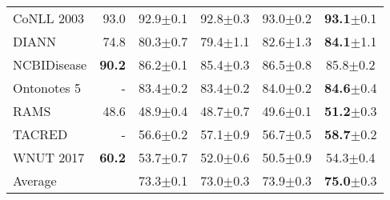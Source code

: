 \begin{table}
{\begin{tabular}{l|r|cc|cc}
            CoNLL 2003 & \citep{lu-etal-2022-unified} 93.0 & 92.9${\scriptscriptstyle\pm}$\tiny{0.1} & 92.8${\scriptscriptstyle\pm}$\tiny{0.3} & 93.0${\scriptscriptstyle\pm}$\tiny{0.2} & \textbf{93.1}${\scriptscriptstyle\pm}$\tiny{0.1} \\
            
            DIANN & \citep{zabala2018hybrid} 74.8 & 80.3${\scriptscriptstyle\pm}$\tiny{0.7} & 79.4${\scriptscriptstyle\pm}$\tiny{1.1} & 82.6${\scriptscriptstyle\pm}$\tiny{1.3} & \textbf{84.1}${\scriptscriptstyle\pm}$\tiny{1.1} \\
            
            NCBIDisease & \citep{DBLP:journals/corr/abs-2304-08085} \textbf{90.2} & 86.2${\scriptscriptstyle\pm}$\tiny{0.1} & 85.4${\scriptscriptstyle\pm}$\tiny{0.3} & 86.5${\scriptscriptstyle\pm}$\tiny{0.8} & 85.8${\scriptscriptstyle\pm}$\tiny{0.2} \\
            
            Ontonotes 5 & - & 83.4${\scriptscriptstyle\pm}$\tiny{0.2} & 83.4${\scriptscriptstyle\pm}$\tiny{0.2} & 84.0${\scriptscriptstyle\pm}$\tiny{0.2} & \textbf{84.6}${\scriptscriptstyle\pm}$\tiny{0.4} \\
            
            RAMS & \citep{li-etal-2021-document} 48.6 & 48.9${\scriptscriptstyle\pm}$\tiny{0.4} & 48.7${\scriptscriptstyle\pm}$\tiny{0.7} & 49.6${\scriptscriptstyle\pm}$\tiny{0.1} & \textbf{51.2}${\scriptscriptstyle\pm}$\tiny{0.3} \\
            
            TACRED & - & 56.6${\scriptscriptstyle\pm}$\tiny{0.2} & 57.1${\scriptscriptstyle\pm}$\tiny{0.9} & 56.7${\scriptscriptstyle\pm}$\tiny{0.5} & \textbf{58.7}${\scriptscriptstyle\pm}$\tiny{0.2} \\
            
            WNUT 2017 & \citep{wang-etal-2021-improving} \textbf{60.2} & 53.7${\scriptscriptstyle\pm}$\tiny{0.7} & 52.0${\scriptscriptstyle\pm}$\tiny{0.6}  & 50.5${\scriptscriptstyle\pm}$\tiny{0.9} & 54.3${\scriptscriptstyle\pm}$\tiny{0.4} \\
            
            \midrule
            Average & & 73.3${\scriptscriptstyle\pm}$\tiny{0.1}  & 73.0${\scriptscriptstyle\pm}$\tiny{0.3} & 73.9${\scriptscriptstyle\pm}$\tiny{0.3} & \textbf{75.0}${\scriptscriptstyle\pm}$\tiny{0.3} \\
            \bottomrule
        \end{tabular}
    }
    \label{tab:main-results}
    \vspace{-.55em}
\end{table}

